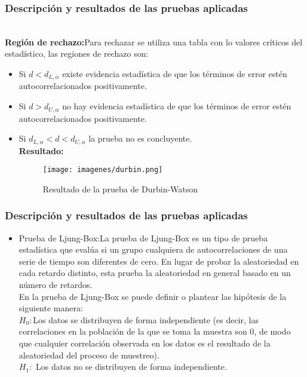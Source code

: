 \documentclass[12pt]{beamer}
\begin{document}
\begin{frame}
\frametitle{Descripción y resultados de las pruebas aplicadas}
~\\ \textbf{Región de rechazo:}Para rechazar se utiliza una tabla con lo valores críticos del estadístico, las regiones de rechazo son:
\begin{itemize}
\item Si $d < d_{L,\alpha}$ existe evidencia estadística de que los términos de error estén autocorrelacionados positivamente.
\item Si $d > d_{U,\alpha}$ no hay evidencia estadística de que los términos de error estén autocorrelacionados positivamente.
\item Si $d_{L,\alpha} < d < d_{U,\alpha}$ la prueba no es concluyente.
~\\ \textbf{Resultado:}
\begin{figure}[!h]
    \begin{center}
        \texttt{[image: imagenes/durbin.png]}
        \caption{Resultado de la prueba de Durbin-Watson}
        \label{fig:Densidad}
    \end{center}
\end{figure}
\end{itemize}
\end{frame}

\begin{frame}
\frametitle{Descripción y resultados de las pruebas aplicadas}
\begin{itemize}
\item Prueba de Ljung-Box:La prueba de Ljung-Box es un tipo de prueba estadística que evalúa si un grupo cualquiera de autocorrelaciones de una serie de tiempo son diferentes de cero. En lugar de probar la aleatoriedad en cada retardo distinto, esta prueba la aleatoriedad en general basado en un número de retardos.
~\\En la prueba de Ljung-Box se puede definir o plantear las hipótesis de la siguiente manera:
~\\$H_{0}:$Los datos se distribuyen de forma independiente (es decir, las correlaciones en la población de la que se toma la muestra son 0, de modo que cualquier correlación observada en los datos es el resultado de la aleatoriedad del proceso de muestreo).
~\\$H_{1}:$ Los datos no se distribuyen de forma independiente.
\end{itemize}
\end{frame}
\end{document}
